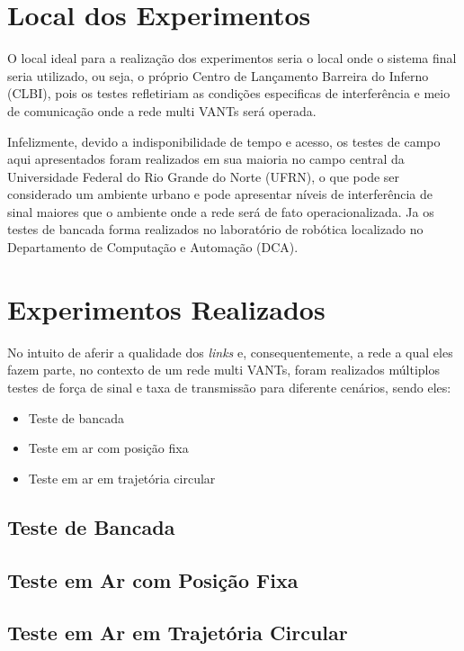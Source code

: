 \section{Local dos Experimentos}

O local ideal para a realização dos experimentos seria o local onde o sistema final seria utilizado, ou seja, o próprio Centro de Lançamento Barreira do Inferno (CLBI), pois os testes refletiriam as condições especificas de interferência e meio de comunicação onde a rede multi VANTs será operada.

Infelizmente, devido a indisponibilidade de tempo e acesso, os testes de campo aqui apresentados foram realizados em sua maioria no campo central da Universidade Federal do Rio Grande do Norte (UFRN), o que pode ser considerado um ambiente urbano e pode apresentar níveis de interferência de sinal maiores que o ambiente onde a rede será de fato operacionalizada. Ja os testes de bancada forma realizados no laboratório de robótica localizado no Departamento de Computação e Automação (DCA).

\section{Experimentos Realizados}

No intuito de aferir a qualidade dos \emph{links} e, consequentemente, a rede a qual eles fazem parte, no contexto de um rede multi VANTs, foram realizados múltiplos testes de força de sinal e taxa de transmissão para diferente cenários, sendo eles:

\begin{itemize}
\item Teste de bancada
\item Teste em ar com posição fixa
\item Teste em ar em trajetória circular
\end{itemize} 

\subsection{Teste de Bancada}



\subsection{Teste em Ar com Posição Fixa}



\subsection{Teste em Ar em Trajetória Circular}
